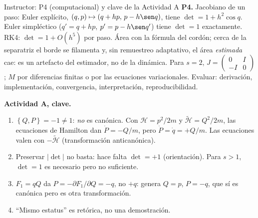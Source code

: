 \documentclass[spanish]{beamer}
\newcommand{\Ham}{\mathcal{H}}               %
\newcommand{\tH}{\tilde{\mathcal{H}}}        %
\newcommand{\pb}[2]{\left\{#1,#2\right\}}    %
\begin{document}
\begin{frame}{Instructor: P4 (computacional) y clave de la Actividad A}
\scriptsize
\textbf{P4.} Jacobiano de un paso: Euler explícito, $(q,p)\mapsto(q+hp,\,p-h\sen q)$,
tiene $\det=1+h^2\cos q$. Euler simpléctico ($q'=q+hp$, $p'=p-h\sen q'$) tiene
$\det=1$ exactamente. RK4: $\det=1+O(h^5)$ por paso.
Área con la fórmula del cordón; cerca de la separatriz el borde se filamenta y, sin
remuestreo adaptativo, el área \emph{estimada} cae: es un artefacto del estimador, no
de la dinámica. Para $s=2$, $J=\begin{pmatrix}0&I\\-I&0\end{pmatrix}$; $M$ por
diferencias finitas o por las ecuaciones variacionales.
Evaluar: derivación, implementación, convergencia, interpretación, reproducibilidad.

\medskip
\textbf{Actividad A, clave.}
\begin{enumerate}
  \item $\pb{Q}{P}=-1\neq1$: \emph{no} es canónica. Con $\Ham=p^2/2m$ y $\tH=Q^2/2m$,
        las ecuaciones de Hamilton dan $\dot P=-Q/m$, pero $\dot P=\dot q=+Q/m$.
        Las ecuaciones valen con $-\tH$ (transformación anticanónica).
  \item Preservar $|\det|$ no basta: hace falta $\det=+1$ (orientación). Para $s>1$,
        $\det=1$ es necesario pero no suficiente.
  \item $F_1=qQ$ da $P=-\partial F_1/\partial Q=-q$, no $+q$: genera $Q=p$, $P=-q$, que sí
        es canónica pero es otra transformación.
  \item “Mismo estatus” es retórica, no una demostración.
\end{enumerate}
\end{frame}
\fi
\end{document}
